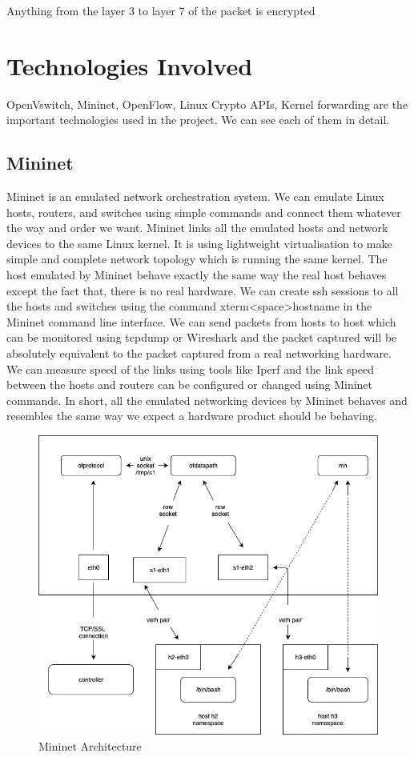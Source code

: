 Anything from the layer 3 to layer 7 of the packet is encrypted\\

\section{Technologies Involved} 

OpenVswitch, Mininet, OpenFlow, Linux Crypto APIs, Kernel forwarding are the important technologies used in the project. We can see each of them in detail.


\subsection{Mininet} 


Mininet\cite{team}\cite{de2014using} is an emulated network orchestration system. We can emulate Linux hosts, routers, and switches using simple commands and connect them whatever the way and order we want. Mininet links all the emulated hosts and network devices to the same Linux kernel. It is using lightweight virtualisation to make simple and complete network topology which is running the same kernel. The host emulated by Mininet behave exactly the same way the real host behaves except the fact that, there is no real hardware. We can create ssh sessions to all the hosts and switches using the command xterm<space>hostname in the Mininet command line interface.  We can send packets from hosts to host which can be monitored using tcpdump or Wireshark and the packet captured will be absolutely equivalent to the packet captured from a real networking hardware. We can measure speed of the links using tools like Iperf and the link speed between the hosts and routers can be configured or changed using Mininet commands. In short, all the emulated networking devices by Mininet behaves and resembles the same way we expect a hardware product should be behaving.
 
\begin{figure}
       \centering\includegraphics[width=\textwidth]{Final/mininet architecture.jpg}
       \caption{Mininet Architecture}
       \label{fig:compbest}
\end{figure}

